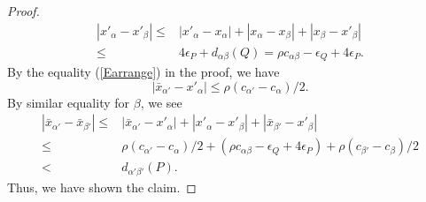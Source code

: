 \documentclass[reqno]{amsart}
\theoremstyle{definition}
\theoremstyle{plain}
\newcommand{\eps}{\epsilon}
\begin{document}
\begin{proof}
\[
\begin{split}
|x'_\alpha-x'_\beta|\leq  &  |x'_\alpha-x_\alpha|+|x_\alpha-x_\beta|+|x_\beta-x'_\beta| \\
\leq & 4\eps_P+d_{\alpha\beta}(Q)
=\rho c_{\alpha\beta}-\eps_Q+4\eps_P.
\end{split}
\]
 By the equality (\ref{Earrange}) in the proof, we have 
\[
|\bar x_{\alpha'}-x'_\alpha|\leq \rho (c_{\alpha'}-c_{\alpha})/2.
\]
By similar equality for $\beta$, we see
\[
\begin{split}
|\bar x_{\alpha'}-\bar x_{\beta'}|\leq  & |\bar x_{\alpha'}-x'_\alpha|+|x'_\alpha-x'_\beta|+ |\bar x_{\beta'}-x'_\beta| \\
\leq &\rho (c_{\alpha'}-c_{\alpha})/2+(\rho c_{\alpha\beta}-\eps_Q+4\eps_P)+\rho (c_{\beta'}-c_{\beta})/2\\
<&   d_{\alpha'\beta'}(P).
\end{split}
\]
Thus, we have shown the claim.
\end{proof}
\end{document}
